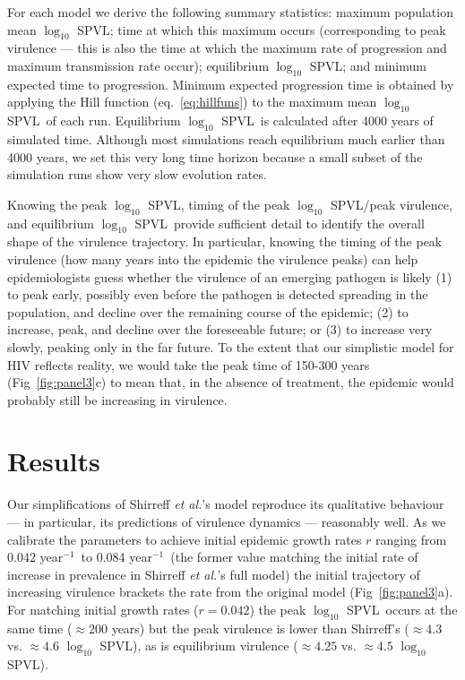 \documentclass[10pt,letterpaper]{article}
\renewcommand{\figurename}{Fig}
\newcommand{\Lspvl}{$\log_{10}$ SPVL}
\newcommand{\etal}{\textit{et al.}}
\newcommand{\peryear}{year$^{-1}$}
\begin{document}
For each model we derive the following summary statistics:
maximum population mean \Lspvl;
time at which this maximum occurs
(corresponding to peak virulence --- this is also the time at which the
maximum rate of progression and maximum transmission rate
occur); equilibrium \Lspvl; 
and minimum expected time to progression. 
Minimum expected progression time is obtained by applying the Hill function (eq.~\ref{eq:hillfuns}) to the maximum mean \Lspvl\ of each run.
Equilibrium \Lspvl\ is calculated after 4000 years of simulated
time. 
Although most simulations reach equilibrium much earlier than 4000 years, we set this very long time horizon because a small subset of the simulation runs show very slow evolution rates.

Knowing the peak \Lspvl, timing of the peak \Lspvl/peak virulence, and equilibrium \Lspvl\ provide sufficient detail to identify the overall shape of the virulence trajectory.
In particular, knowing the timing of the peak virulence (how many years
into the epidemic the virulence peaks) can help epidemiologists
guess whether the virulence of an emerging pathogen is likely (1)
to peak early, possibly even before the pathogen is detected
spreading in the population, and decline over the remaining course
of the epidemic; (2) to increase, peak, and decline over the
foreseeable future; or (3) to increase very slowly, peaking only
in the far future. To the extent that our simplistic model for HIV
reflects reality, we would take the peak time of 150-300 years 
(\figurename~\ref{fig:panel3}c) to mean that, in the absence of
treatment, the epidemic would probably still be increasing in virulence.

\section*{Results}

Our simplifications of Shirreff \etal's model \cite{shirreff_transmission_2011} reproduce its qualitative behaviour --- in particular, its predictions of virulence dynamics --- reasonably well. As we calibrate the parameters to achieve initial epidemic growth rates $r$ ranging
from 0.042 \peryear\ to 0.084 \peryear\ (the former value matching the initial rate of increase in prevalence in Shirreff \etal's full model) the initial trajectory of increasing virulence brackets the rate from the original model (\figurename~\ref{fig:panel3}a). 
For matching initial growth rates ($r=0.042$)
the peak \Lspvl\ occurs at the same time ($\approx 200$ years)
but the peak virulence is lower than 
Shirreff's ($\approx 4.3$ vs. $\approx 4.6$ \Lspvl),
as is equilibrium virulence ($\approx 4.25$ vs. $\approx 4.5$ \Lspvl).
\end{document}
